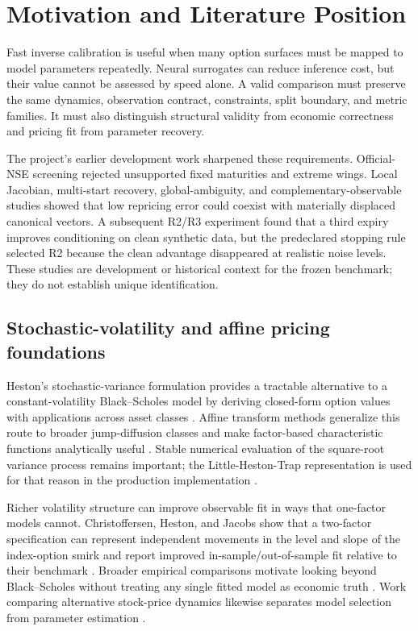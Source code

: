 \section{Motivation and Literature Position}
\label{sec:motivation}

Fast inverse calibration is useful when many option surfaces must be mapped to model
parameters repeatedly. Neural surrogates can reduce inference cost, but their value
cannot be assessed by speed alone. A valid comparison must preserve the same dynamics,
observation contract, constraints, split boundary, and metric families. It must also
distinguish structural validity from economic correctness and pricing fit from
parameter recovery.

The project's earlier development work sharpened these requirements. Official-NSE
screening rejected unsupported fixed maturities and extreme wings. Local Jacobian,
multi-start recovery, global-ambiguity, and complementary-observable studies showed
that low repricing error could coexist with materially displaced canonical vectors.
A subsequent R2/R3 experiment found that a third expiry improves conditioning on clean
synthetic data, but the predeclared stopping rule selected R2 because the clean
advantage disappeared at realistic noise levels. These studies are development or
historical context for the frozen benchmark; they do not establish unique
identification.

\subsection{Stochastic-volatility and affine pricing foundations}
\label{subsec:literature-stochastic-volatility}

Heston's stochastic-variance formulation provides a tractable alternative to a
constant-volatility Black--Scholes model by deriving closed-form option values with
applications across asset classes \citep{heston1993closed}. Affine transform methods
generalize this route to broader jump-diffusion classes and make factor-based
characteristic functions analytically useful \citep{duffie2000transform}. Stable
numerical evaluation of the square-root variance process remains important; the
Little-Heston-Trap representation is used for that reason in the production
implementation \citep{albrecher2007little}.

Richer volatility structure can improve observable fit in ways that one-factor models
cannot. Christoffersen, Heston, and Jacobs show that a two-factor specification can
represent independent movements in the level and slope of the index-option smirk and
report improved in-sample/out-of-sample fit relative to their benchmark
\citep{christoffersen2009shape}. Broader empirical comparisons motivate looking beyond
Black--Scholes without treating any single fitted model as economic truth
\citep{bakshi1997empirical}. Work comparing alternative stock-price dynamics likewise
separates model selection from parameter estimation \citep{chernov2003alternative}.


